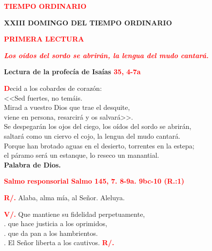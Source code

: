 \documentclass[12pt, letterpaper]{report}
\begin{document}
\begin{center}
\Large {\bfseries \textcolor{red}{TIEMPO ORDINARIO}}
\end{center}

\begin{center}
\Huge {\bfseries XXIII DOMINGO DEL TIEMPO ORDINARIO}
\end{center}

\begin{center}
\Large {\bfseries \textcolor{red}{PRIMERA LECTURA}}
\end{center}

\begin{center}
\large {\bfseries \textit{ \textcolor{red}{Los o\'idos del sordo se abrir\'an, la lengua del mudo cantar\'a.}}}
\end{center}

\Large {\bfseries Lectura de la profec\'ia de  Isa\'ias \hspace{1cm} \textcolor{red}{35, 4-7a}}

\lettrine[lines=2]{\bfseries \textcolor{red}{D}}{}\Large ecid a los cobardes de coraz\'on:\\
<<Sed fuertes, no tem\'ais.\\
Mirad a vuestro Dios que trae el desquite,\\
viene en persona, resarcir\'a y os salvar\'a>>.\\
Se despegar\'an los ojos del ciego, los o\'idos del sordo se abrir\'an,\\
saltar\'a como un ciervo el cojo, la lengua del mudo cantar\'a.\\
Porque han brotado aguas en el desierto, torrentes en la estepa;\\
el p\'aramo ser\'a un estanque, lo reseco un manantial.\\

{\bfseries Palabra de Dios.}

\Large {\bfseries \textcolor{red}{Salmo responsorial \hspace{1cm} Salmo 145, 7. 8-9a. 9bc-10 (R.:1)}}

\Large {\bfseries \textcolor{red}{R/.}} \hspace{1cm} Alaba, alma m\'ia, al Se\~nor. Aleluya.

{\bfseries \textcolor{red}{V/.}} \hspace{1cm} Que mantiene su fidelidad perpetuamente,\\
. \hspace{2.5cm} que hace justicia a los oprimidos,\\
. \hspace{2.5cm} que da pan a los hambrientos.\\
. \hspace{2.5cm} El Se\~nor liberta a los cautivos.
\hspace{1cm} {\bfseries \textcolor{red}{R/.}}
\end{document}
